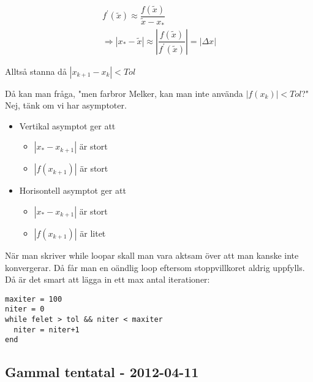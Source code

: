 \begin{equation*}
  \begin{gathered}
    f^{\prime}(\tilde{x})\approx \dfrac{f(\tilde{x})}{\tilde{x}-x_*}\\
    \Rightarrow \left|x_*-\tilde{x}\right|\approx\left|\dfrac{f(\tilde{x})}{f^{\prime}(\tilde{x})}\right| = \left|\Delta x\right|
  \end{gathered}
\end{equation*}
\par\bigskip
\noindent Alltså stanna då $\left|x_{k+1}-x_k\right|<Tol$
\par\bigskip
\noindent Då kan man fråga, "men farbror Melker, kan man inte använda $\left|f(x_k)\right|<Tol$?" Nej, tänk om vi har asymptoter.
\par\bigskip

\begin{itemize}
  \item Vertikal asymptot ger att
    \begin{itemize}
      \item $\left|x_*-x_{k+1}\right|$ är stort
      \item $\left|f(x_{k+1})\right|$ är stort
    \end{itemize}
  \item Horisontell asymptot ger att
    \begin{itemize}
      \item $\left|x_*-x_{k+1}\right|$ är stort
      \item $\left|f(x_{k+1})\right|$ är litet
    \end{itemize}
\end{itemize}
\par\bigskip
\noindent När man skriver while loopar skall man vara aktsam över att man kanske inte konvergerar. Då får man en oändlig loop eftersom stoppvillkoret aldrig uppfylls. Då är det smart att lägga in ett max antal iterationer:
\par\bigskip

\begin{verbatim}
maxiter = 100
niter = 0
while felet > tol && niter < maxiter
  niter = niter+1
end
\end{verbatim}

\subsection{Gammal tentatal - 2012-04-11}\hfill\\

